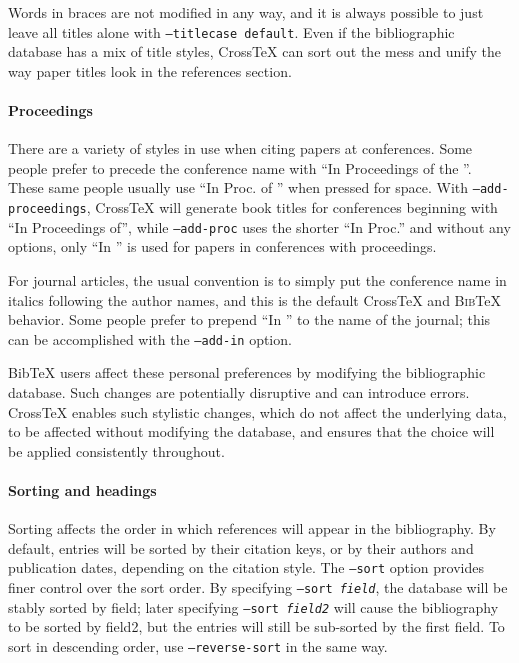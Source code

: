 \documentclass{article}
\newcommand{\XTeX}{Cross\TeX}
\newcommand{\BibTeX}{\textsc{Bib}\TeX}
\begin{document}
Words in braces are not modified in any way,
and it is always possible to just leave all titles alone with
\texttt{--titlecase default}. Even if the bibliographic database has
a mix of title styles, \XTeX{} can sort out the mess and unify the way 
paper titles look in the references section.

\paragraph{Proceedings}

There are a variety of styles in use when citing papers at conferences. Some
people prefer to precede the conference name with ``In Proceedings of the ''. 
These same people usually use ``In Proc. of '' when pressed for space.
With \texttt{--add-proceedings}, \XTeX{}
will generate book titles for conferences beginning with ``In
Proceedings of'', while \texttt{--add-proc} uses the shorter ``In
Proc.'' and without any options, only ``In '' is used for papers
in conferences with proceedings. 

For journal articles, the usual convention is to simply put the 
conference name in italics following the author names, and this is
the default \XTeX{} and \BibTeX{} behavior. Some people prefer to prepend
``In '' to the name of the journal; this can be accomplished with the 
\texttt{--add-in} option.

BibTeX users affect these personal preferences by modifying the bibliographic
database. Such changes are potentially disruptive and can introduce errors. 
\XTeX{} enables such stylistic changes, which do not affect the underlying data, 
to be affected without modifying the database, and ensures that the choice will
be applied consistently throughout.

\paragraph{Sorting and headings}

Sorting affects the order in which references will appear in the bibliography.
By default, entries will be sorted by their citation keys, or by their
authors and publication dates, depending on the citation style. 
The \texttt{--sort} option provides
finer control over the sort order. By specifying \texttt{--sort
\textrm{\textit{field}}}, the database will be stably sorted by field;
later specifying \texttt{--sort \textrm{\textit{field2}}} will cause
the bibliography to be sorted by field2, but the entries will still be
sub-sorted by the first field. To sort in descending order, 
use \texttt{--reverse-sort} in the same way.
\end{document}
